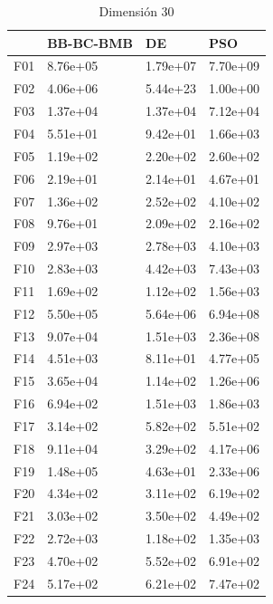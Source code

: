 \begin{table}[H]
\begin{minipage}{.5\linewidth}
    \end{minipage}%
    \begin{minipage}{.5\linewidth}
      \centering
        \caption{Dimensión 30}
        \begin{tabular}{llll}
          \toprule
          {} & BB-BC-BMB &        DE &       PSO \\
          \midrule
          F01  &  8.76e+05 &  1.79e+07 &  7.70e+09 \\
          F02  &  4.06e+06 &  5.44e+23 &  1.00e+00 \\
          F03  &  1.37e+04 &  1.37e+04 &  7.12e+04 \\
          F04  &  5.51e+01 &  9.42e+01 &  1.66e+03 \\
          F05  &  1.19e+02 &  2.20e+02 &  2.60e+02 \\
          F06  &  2.19e+01 &  2.14e+01 &  4.67e+01 \\
          F07  &  1.36e+02 &  2.52e+02 &  4.10e+02 \\
          F08  &  9.76e+01 &  2.09e+02 &  2.16e+02 \\
          F09  &  2.97e+03 &  2.78e+03 &  4.10e+03 \\
          F10  &  2.83e+03 &  4.42e+03 &  7.43e+03 \\
          F11  &  1.69e+02 &  1.12e+02 &  1.56e+03 \\
          F12  &  5.50e+05 &  5.64e+06 &  6.94e+08 \\
          F13  &  9.07e+04 &  1.51e+03 &  2.36e+08 \\
          F14  &  4.51e+03 &  8.11e+01 &  4.77e+05 \\
          F15  &  3.65e+04 &  1.14e+02 &  1.26e+06 \\
          F16  &  6.94e+02 &  1.51e+03 &  1.86e+03 \\
          F17  &  3.14e+02 &  5.82e+02 &  5.51e+02 \\
          F18  &  9.11e+04 &  3.29e+02 &  4.17e+06 \\
          F19  &  1.48e+05 &  4.63e+01 &  2.33e+06 \\
          F20  &  4.34e+02 &  3.11e+02 &  6.19e+02 \\
          F21  &  3.03e+02 &  3.50e+02 &  4.49e+02 \\
          F22  &  2.72e+03 &  1.18e+02 &  1.35e+03 \\
          F23  &  4.70e+02 &  5.52e+02 &  6.91e+02 \\
          F24  &  5.17e+02 &  6.21e+02 &  7.47e+02 \\

\end{tabular}
\end{minipage}
\end{table}
